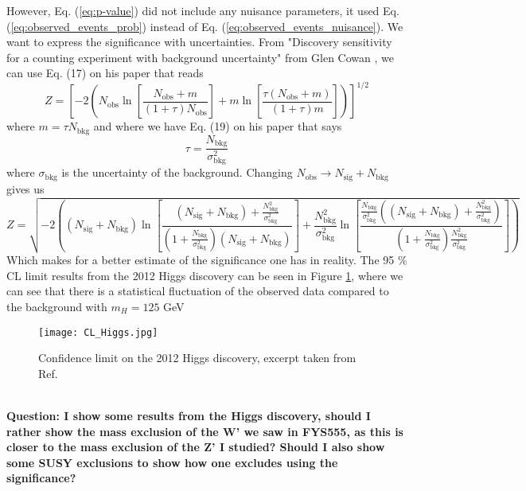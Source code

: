 \documentclass[12pt, a4paper]{book}
\begin{document}
However, Eq. (\ref{eq:p-value}) did not include any nuisance parameters, it used Eq. (\ref{eq:observed_events_prob}) instead of Eq. (\ref{eq:observed_events_nuisance}). We want to express the significance with uncertainties. From "Discovery sensitivity for a counting experiment with background uncertainty" from Glen Cowan
\cite{Cowan_Uncertainty_in_sig}, we can use Eq. (17) on his paper that reads
$$
Z = \left[-2\left(N_{\text{obs}}\ln\left[\frac{N_{\text{obs}}+m}{(1+\tau)N_{\text{obs}}}\right] + m\ln\left[\frac{\tau(N_{\text{obs}}+m)}{(1+\tau)m}\right]\right)\right]^{1/2}
$$
where $m=\tau N_{\text{bkg}}$ and where we have Eq. (19) on his paper that says
$$
\tau=\frac{N_{\text{bkg}}}{\sigma_{\text{bkg}}^2}
$$
where $\sigma_{\text{bkg}}$ is the uncertainty of the background. Changing $N_{\text{obs}} \rightarrow N_{\text{sig}}+N_{\text{bkg}}$ gives us
\begin{equation}\label{eq:significance}
    \textstyle    Z = \sqrt{-2\left((N_{\text{sig}}+N_{\text{bkg}})\ln\left[\frac{(N_{\text{sig}}+N_{\text{bkg}})+\frac{N_{\text{bkg}}^2}{\sigma_{\text{bkg}}^2} }{(1+\frac{N_{\text{bkg}}}{\sigma_{\text{bkg}}^2})(N_{\text{sig}}+N_{\text{bkg}})}\right] + \frac{N_{\text{bkg}}^2}{\sigma_{\text{bkg}}^2} \ln\left[\frac{\frac{N_{\text{bkg}}}{\sigma_{\text{bkg}}^2}((N_{\text{sig}}+N_{\text{bkg}})+\frac{N_{\text{bkg}}^2}{\sigma_{\text{bkg}}^2} )}{(1+\frac{N_{\text{bkg}}}{\sigma_{\text{bkg}}^2})\frac{N_{\text{bkg}}^2}{\sigma_{\text{bkg}}^2}}\right]\right)}
\end{equation}
Which makes for a better estimate of the significance one has in reality.
\newpage\noindent The 95 \% CL limit results from the 2012 Higgs discovery \cite{Higgs_discovery_2012} can be seen in Figure \ref{fig:HIGGS_CL}, where we can see that there is a statistical fluctuation of the observed data compared to the background with $m_H=125$ GeV
\begin{figure}[!ht]
	\centering
    \texttt{[image: CL\_Higgs.jpg]}
    \caption[Confidence Limit on the Higgs discovery]{Confidence limit on the 2012 Higgs discovery, excerpt taken from Ref. \cite{Higgs_discovery_2012}}\label{fig:HIGGS_CL}
\end{figure}
\\\textbf{Question: I show some results from the Higgs discovery, should I rather show the mass exclusion of the W' we saw in FYS555, as this is closer to the mass exclusion of the Z' I studied? Should I also show some SUSY exclusions to show how one excludes using the significance?}
\end{document}
